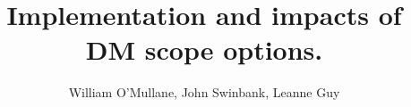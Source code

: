 \documentclass[DM,TN,lsstdraft]{lsstdoc}
\title[DM scope options] {Implementation and impacts of DM scope options.}
\author   {William O'Mullane, John Swinbank, Leanne Guy}
\begin{document}
\mkshorttitle





\appendix


\end{document}
